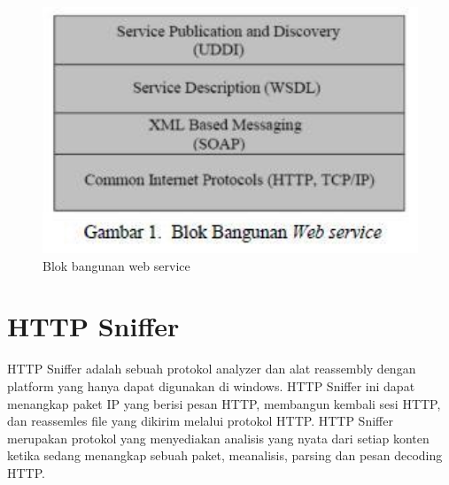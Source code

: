 \begin{figure}[ht]
\centerline{\includegraphics[width=1\textwidth]{figures/2webservicehttp.jpg}}
\caption{Blok bangunan web service}
\label{2webservicehttp}
\end{figure}

\section{HTTP Sniffer}
HTTP Sniffer adalah sebuah protokol analyzer dan alat reassembly dengan platform yang hanya dapat digunakan di windows. HTTP Sniffer ini dapat menangkap paket IP yang berisi pesan HTTP, membangun kembali sesi HTTP, dan reassemles file yang dikirim melalui protokol HTTP. HTTP Sniffer merupakan protokol yang menyediakan analisis yang nyata dari setiap konten ketika sedang menangkap sebuah paket, meanalisis, parsing dan pesan decoding HTTP\cite{sujana2015perangkat}.
